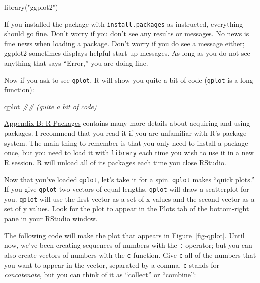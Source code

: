 \documentclass[
  letterpaper,
  DIV=11,
  numbers=noendperiod]{scrbook}
\newenvironment{Shaded}{\begin{snugshade}}{\end{snugshade}}
\newcommand{\DocumentationTok}[1]{\textcolor[rgb]{0.37,0.37,0.37}{\textit{#1}}}
\newcommand{\FunctionTok}[1]{\textcolor[rgb]{0.28,0.35,0.67}{#1}}
\newcommand{\NormalTok}[1]{\textcolor[rgb]{0.00,0.23,0.31}{#1}}
\newcommand{\StringTok}[1]{\textcolor[rgb]{0.13,0.47,0.30}{#1}}
\begin{document}
\begin{Shaded}
\begin{Highlighting}[]
\FunctionTok{library}\NormalTok{(}\StringTok{"ggplot2"}\NormalTok{)}
\end{Highlighting}
\end{Shaded}

If you installed the package with \texttt{install.packages} as
instructed, everything should go fine. Don't worry if you don't see any
results or messages. No news is fine news when loading a package. Don't
worry if you do see a message either; ggplot2 sometimes displays helpful
start up messages. As long as you do not see anything that says
``Error,'' you are doing fine.

Now if you ask to see \texttt{qplot}, R will show you quite a bit of
code (\texttt{qplot} is a long function):

\begin{Shaded}
\begin{Highlighting}[]
\NormalTok{qplot}
\DocumentationTok{\#\# (quite a bit of code)}
\end{Highlighting}
\end{Shaded}

\hyperref[sec-appendix-packages]{Appendix B: R Packages} contains many
more details about acquiring and using packages. I recommend that you
read it if you are unfamiliar with R's package system. The main thing to
remember is that you only need to install a package once, but you need
to load it with \texttt{library} each time you wish to use it in a new R
session. R will unload all of its packages each time you close RStudio.

Now that you've loaded \texttt{qplot}, let's take it for a spin.
\texttt{qplot} makes ``quick plots.'' If you give \texttt{qplot} two
vectors of equal lengths, \texttt{qplot} will draw a scatterplot for
you. \texttt{qplot} will use the first vector as a set of x values and
the second vector as a set of y values. Look for the plot to appear in
the Plots tab of the bottom-right pane in your RStudio window.

The following code will make the plot that appears in
Figure~\ref{fig-qplot}. Until now, we've been creating sequences of
numbers with the \texttt{:} operator; but you can also create vectors of
numbers with the \texttt{c} function. Give \texttt{c} all of the numbers
that you want to appear in the vector, separated by a comma. \texttt{c}
stands for \emph{concatenate}, but you can think of it as ``collect'' or
``combine'':
\end{document}
